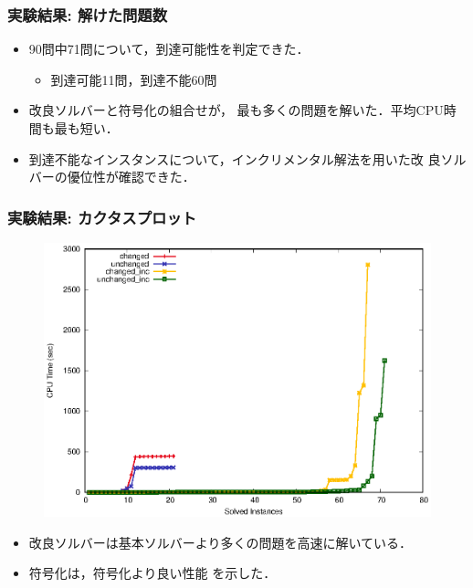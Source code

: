 \documentclass[dvipdfmx,11pt]{beamer}
\begin{document}
\begin{frame}\frametitle{実験結果: 解けた問題数}

  \begin{exampleblock}{}
    \centering
    \renewcommand{\arraystretch}{1.2}
    \scalebox{0.9}{}
  \end{exampleblock}

  \begin{itemize}
  \item 90問中71問について，到達可能性を判定できた．
    \begin{itemize}
    \item 到達可能11問，到達不能60問
    \end{itemize}
  \item 改良ソルバーと符号化の組合せが，
    最も多くの問題を解いた．平均CPU時間も最も短い．
  \item 到達不能なインスタンスについて，インクリメンタル解法を用いた改
    良ソルバーの優位性が確認できた．
  \end{itemize}
\end{frame}
\begin{frame}\frametitle{実験結果: カクタスプロット}

  \begin{figure}[h]
    \centering
    \includegraphics[scale=0.7]{fig/cactus.eps}
  \end{figure}

  \begin{itemize}
    \item 改良ソルバーは基本ソルバーより多くの問題を高速に解いている．
    \item {} 符号化は，符号化より良い性能
      を示した．
  \end{itemize}
  
\end{frame}
\end{document}
